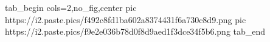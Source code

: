  
 
 
 
 
\zzSecCmtScr

\ifcmt
  tab_begin cols=2,no_fig,center
     pic https://i2.paste.pics/f492c8fd1ba602a8374431f6a730c8d9.png
		 pic https://i2.paste.pics/f9e2e036b78d0f8d9aed1f3dce34f5b6.png
  tab_end
\fi
